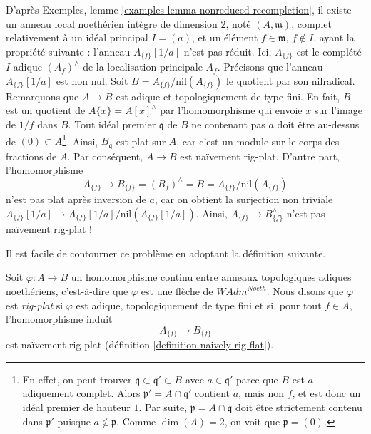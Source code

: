 \begin{example}
\label{example-recompletion-not-rig-flat}
D'après Exemples, lemme \ref{examples-lemma-nonreduced-recompletion},
il existe un anneau local noethérien intègre de dimension $2$, noté $(A, \mathfrak m)$,
complet relativement à un idéal principal $I = (a)$, et un élément
$f \in \mathfrak m$, $f \not \in I$, ayant la propriété suivante :
l'anneau $A_{\{f\}}[1/a]$ n'est pas réduit.
Ici, $A_{\{f\}}$ est le complété $I$-adique $(A_f)^\wedge$ de la localisation
principale $A_f$. Précisons que l'anneau $A_{\{f\}}[1/a]$ est non nul.
Soit $B = A_{\{f\}}/ \text{nil}(A_{\{f\}})$ le quotient
par son nilradical. Remarquons que $A \to B$ est adique et
topologiquement de type fini.
En fait, $B$ est un quotient de $A\{x\} = A[x]^\wedge$ par
l'homomorphisme qui envoie $x$ sur l'image de $1/f$ dans $B$.
Tout idéal premier $\mathfrak q$ de $B$ ne contenant pas $a$ doit
être au-dessus de $(0) \subset A$\footnote{En effet, on peut trouver
$\mathfrak q \subset \mathfrak q' \subset B$ avec $a \in \mathfrak q'$
parce que $B$ est $a$-adiquement complet. Alors $\mathfrak p' = A \cap \mathfrak q'$
contient $a$, mais non $f$, et est donc un idéal premier de hauteur $1$.
Par suite, $\mathfrak p = A \cap \mathfrak q$ doit être strictement
contenu dans $\mathfrak p'$ puisque $a \not \in \mathfrak p$. Comme
$\dim(A) = 2$, on voit que $\mathfrak p = (0)$.}. Ainsi, $B_\mathfrak q$
est plat sur $A$, car c'est un module sur le
corps des fractions de $A$. Par conséquent, $A \to B$ est naïvement rig-plat.
D'autre part, l'homomorphisme
$$
A_{\{f\}}
\longrightarrow
B_{\{f\}} = (B_f)^\wedge = B = A_{\{f\}} /\text{nil}(A_{\{f\}})
$$
n'est pas plat après inversion de $a$, car on obtient la surjection non triviale
$A_{\{f\}}[1/a] \to A_{\{f\}}[1/a]/\text{nil}(A_{\{f\}}[1/a])$.
Ainsi, $A_{\{f\}} \to B_{\{f\}}^\wedge$ n'est pas naïvement rig-plat !
\end{example}

\noindent
Il est facile de contourner ce problème en adoptant
la définition suivante.

\begin{definition}
\label{definition-rig-flat-continuous-homomorphism}
Soit $\varphi : A \to B$ un homomorphisme continu entre anneaux
topologiques adiques noethériens, c'est-à-dire que $\varphi$ est une flèche de
$\textit{WAdm}^{Noeth}$. Nous disons que $\varphi$ est {\it rig-plat} si $\varphi$
est adique, topologiquement de type fini et si, pour tout $f \in A$, l'homomorphisme induit
$$
A_{\{f\}} \longrightarrow B_{\{f\}}
$$
est naïvement rig-plat (définition \ref{definition-naively-rig-flat}).
\end{definition}

